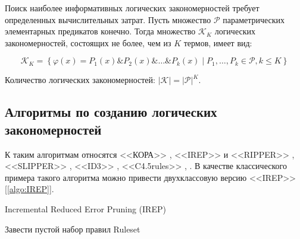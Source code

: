 \documentclass[12pt]{article}
\begin{document}

Поиск наиболее информативных логических закономерностей требует
определенных вычислительных затрат. Пусть множество \(\mathcal{P}\)
параметрических элементарных предикатов конечно. Тогда множество
\(\mathcal{K}_K\) логических закономерностей, состоящих не более, чем
из \(K\) термов, имеет вид:

\[
\mathcal{K}_K =
\left\{
 \varphi(x) = P_1(x) \& P_2(x) \& \dots \& P_k(x) \mid
  P_1, \dots, P_k \in \mathcal{P}, k \leq K
\right\}
\]

Количество логических закономерностей: \(\lvert \mathcal{K} \rvert =
\lvert \mathcal{P} \rvert^{K}\).

\subsection{Алгоритмы по созданию логических закономерностей}

К таким алгоритмам относятся <<КОРА>> \cite{vainzvaig73kora}, <<IREP>>
и <<RIPPER>> \cite{cohen95fast}, <<SLIPPER>> \cite{cohen99simple},
<<ID3>> \cite{quinlan86induction}, <<C4.5rules>>
\cite{quinlan93programs}, \cite{quinlan96bagging}.  В качестве
классического примера такого алгоритма можно привести двухклассовую
версию <<IREP>> [\ref{algo:IREP}].

\begin{algorithm}[!htpb]
  \caption{Incremental Reduced Error Pruning (IREP)}\label{algo:IREP}
   {
    Завести пустой набор правил Ruleset\;
    \;
  }
\end{algorithm}
\end{document}
